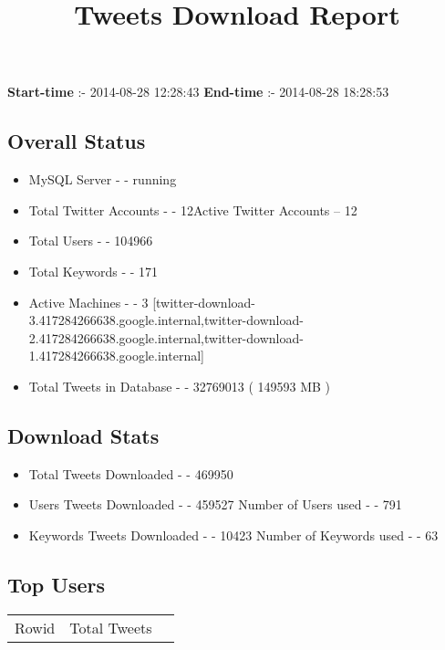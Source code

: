\documentclass{article}\usepackage[T1]{fontenc}
\begin{document}
\title{\textbf{Tweets Download Report}}
               \date{}
                \maketitle
               \centerline{\textbf{Start-time} :- 2014-08-28 12:28:43 \hspace{40pt} \textbf{End-time} :- 2014-08-28 18:28:53}               \subsection*{Overall Status}                \begin{itemize}                \item MySQL Server - - running               \item Total Twitter Accounts - - 12\newline Active Twitter Accounts -- 12               \item Total Users - - 104966               \item Total Keywords - - 171               \item Active Machines - - 3 [twitter-download-3.417284266638.google.internal,twitter-download-2.417284266638.google.internal,twitter-download-1.417284266638.google.internal]               \item Total Tweets in Database - - 32769013 ( 149593 MB )               \end{itemize}               \subsection*{Download Stats}                \begin{itemize}                \item Total Tweets Downloaded - - 469950               \item Users Tweets Downloaded - - 459527 \newline Number of Users used - - 791               \item Keywords Tweets Downloaded - - 10423 \newline Number of Keywords used - - 63              \end{itemize}              \subsection*{Top Users}\begin{tabular}{|c|c|c|}         \hline         Rowid & Total Tweets \\ 

\end{tabular}
\end{document}
